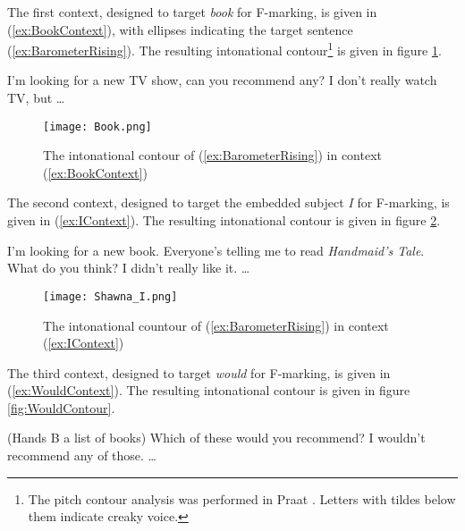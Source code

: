 \documentclass[
	letterpaper,
]{article}
\begin{document}
The first context, designed to target \textit{book} for F-marking, is given in (\ref{ex:BookContext}), with ellipses indicating the target sentence (\ref{ex:BarometerRising}).
The resulting intonational contour\footnote{
	The pitch contour analysis was performed in Praat \parencite{praat}.
	Letters with tildes below them indicate creaky voice.
} is given in figure \ref{fig:BookContour}.
\begin{exe}
\ex\label{ex:BookContext}
\begin{xlist}
	 I'm looking for a new TV show, can you recommend any?
	 I don't really watch TV, but \dots
\end{xlist}
\end{exe}
\begin{figure}[h]
	\centering
	\texttt{[image: Book.png]}
	\caption{The intonational contour of (\ref{ex:BarometerRising}) in context (\ref{ex:BookContext})}
	\label{fig:BookContour}
\end{figure}
\FloatBarrier
The second context, designed to target the embedded subject \textit{I} for F-marking, is given in (\ref{ex:IContext}).
The resulting intonational contour is given in figure \ref{fig:IContour}.
\begin{exe}
\ex\label{ex:IContext}
\begin{xlist}
	 I'm looking for a new book. Everyone's telling me to read \textit{Handmaid's Tale}. What do you think?
	 I didn't really like it. \dots
\end{xlist}	
\end{exe}

\begin{figure}[h]
	\centering
	\texttt{[image: Shawna\_I.png]}
	\caption{The intonational countour of (\ref{ex:BarometerRising}) in context (\ref{ex:IContext})}
	\label{fig:IContour}
\end{figure}
\FloatBarrier
The third context, designed to target \textit{would} for F-marking, is given in (\ref{ex:WouldContext}).
The resulting intonational contour is given in figure \ref{fig:WouldContour}.
\begin{exe}
\ex\label{ex:WouldContext}
\begin{xlist}
	 (Hands B a list of books) Which of these would you recommend?
	 I wouldn't recommend any of those. \dots
\end{xlist}	
\end{exe}
\end{document}
